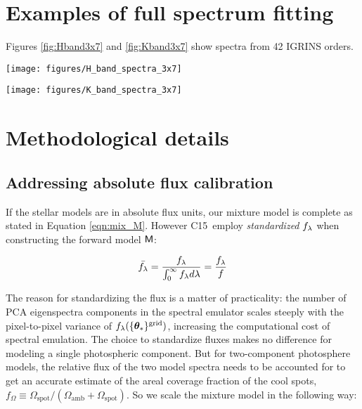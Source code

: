 \documentclass[twocolumn]{emulateapj}%
\newcommand{\iancze}{{\sc C15}}
\begin{document}
\clearpage
\pagebreak


\appendix

\section{Examples of full spectrum fitting}

Figures \ref{fig:Hband3x7} and \ref{fig:Kband3x7} show spectra from 42 IGRINS orders.


\begin{figure*}
 \centering
 \texttt{[image: figures/H\_band\_spectra\_3x7]}
 \caption{IGRINS Orders 94 and $99-119$.  Note that the $y-$axis is on a logarithmic scale.  The red line is the cool photosphere while the blue line is the hot photosphere.  The purple line is the composite mixture model.}
 \label{fig:Hband3x7}
\end{figure*}

\begin{figure*}
 \centering
 \texttt{[image: figures/K\_band\_spectra\_3x7]}
 \caption{IGRINS Orders $73-93$.  Note that the $y-$axis is on a logarithmic scale.  Cools are the same as Figure \ref{fig:Hband3x7}}
 \label{fig:Kband3x7}
\end{figure*}


\section{Methodological details}
\label{methods-details}

\subsection{Addressing absolute flux calibration}
If the stellar models are in absolute flux units, our mixture model is complete as stated in Equation \ref{eqn:mix_M}.  However \iancze\ employ \emph{standardized} $f_\lambda$ when constructing the forward model $\mathsf{M}$:


\begin{eqnarray} \label{eqn:normalization}
\bar {f_\lambda} = \frac{f_\lambda}{\int_{0}^{\infty} f_\lambda d\lambda} = \frac{f_\lambda}{f}
\end{eqnarray}

The reason for standardizing the flux is a matter of practicality: the number of PCA eigenspectra components in the spectral emulator scales steeply with the pixel-to-pixel variance of $f_{\lambda}(\{{\bm \theta}_{\ast}\}^\textrm{grid})$, increasing the computational cost of spectral emulation.  The choice to standardize fluxes makes no difference for modeling a single photospheric component.  But for two-component photosphere models, the relative flux of the two model spectra needs to be accounted for to get an accurate estimate of the areal coverage fraction of the cool spots, $f_{\Omega} \equiv \Omega_{\mathrm{spot}}/(\Omega_{\mathrm{amb}}+\Omega_{\mathrm{spot}})$.  So we scale the mixture model in the following way:
\end{document}
